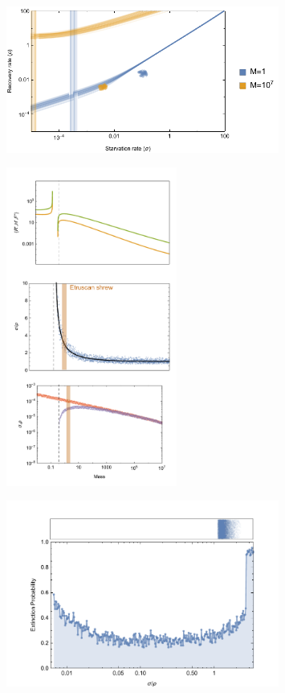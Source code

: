 \documentclass[12pt,english]{article}
\begin{document}
\begin{spacing}{1.9}
 \begin{figure}[h]
 	\centering
 	\includegraphics[width=0.8\textwidth]{fig_DataHopf.pdf}
 	\caption{
 	}
 	\label{DataHopf}
 \end{figure}
 
 
	\begin{figure}[h]
 	\centering
 	\includegraphics[width=0.5\textwidth]{fig_FPAllometric.pdf}
 	\caption{
 	}
 	\label{Asymp}
 \end{figure}
 
  \begin{figure}[h]
 	\centering
 	\includegraphics[width=0.8\textwidth]{fig_ExtinctionAllometric.pdf}
 	\caption{
 	}
 	\label{Ext}
 \end{figure}
 


\end{spacing}
\end{document}
